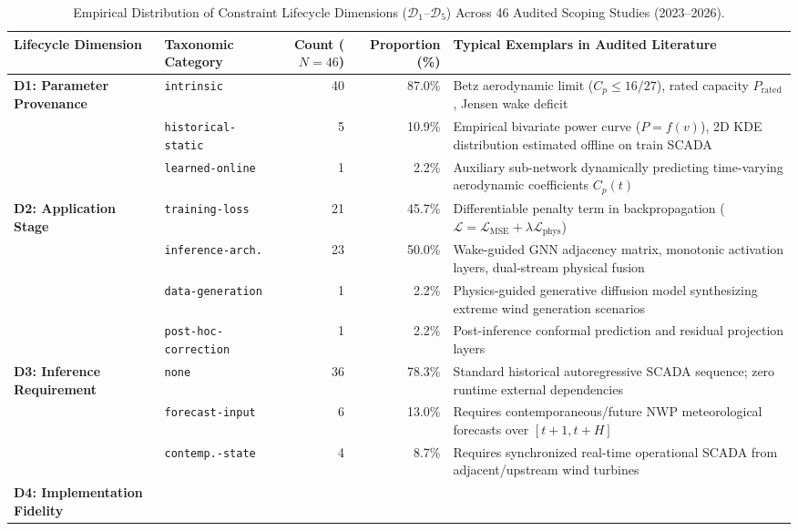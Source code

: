 \begin{table}[!t]
\centering
\footnotesize
\renewcommand{\arraystretch}{0.90}
\setlength{\tabcolsep}{2.5pt}
\caption{Empirical Distribution of Constraint Lifecycle Dimensions ($\mathcal{D}_1$--$\mathcal{D}_5$) Across 46 Audited Scoping Studies (2023--2026).}
\label{tab:lifecycle_distribution}
\noindent\begin{tabularx}{\linewidth}{p{3.2cm}p{3.1cm}rrX}
\toprule
\textbf{Lifecycle Dimension} & \textbf{Taxonomic Category} & \textbf{Count ($N=46$)} & \textbf{Proportion (\%)} & \textbf{Typical Exemplars in Audited Literature} \\
\midrule
\multirow{3}{=}{\textbf{D1: Parameter Provenance}} 
& \texttt{intrinsic} & 40 & 87.0\% & Betz aerodynamic limit ($C_p \le 16/27$), rated capacity $P_{\text{rated}}$, Jensen wake deficit \\
& \texttt{historical-static} & 5 & 10.9\% & Empirical bivariate power curve ($P=f(v)$), 2D KDE distribution estimated offline on train SCADA \\
& \texttt{learned-online} & 1 & 2.2\% & Auxiliary sub-network dynamically predicting time-varying aerodynamic coefficients $C_p(t)$ \\
\midrule
\multirow{4}{=}{\textbf{D2: Application Stage}} 
& \texttt{training-loss} & 21 & 45.7\% & Differentiable penalty term in backpropagation ($\mathcal{L} = \mathcal{L}_{\text{MSE}} + \lambda \mathcal{L}_{\text{phys}}$) \\
& \texttt{inference-arch.} & 23 & 50.0\% & Wake-guided GNN adjacency matrix, monotonic activation layers, dual-stream physical fusion \\
& \texttt{data-generation} & 1 & 2.2\% & Physics-guided generative diffusion model synthesizing extreme wind generation scenarios \\
& \texttt{post-hoc-correction} & 1 & 2.2\% & Post-inference conformal prediction and residual projection layers \\
\midrule
\multirow{3}{=}{\textbf{D3: Inference Requirement}} 
& \texttt{none} & 36 & 78.3\% & Standard historical autoregressive SCADA sequence; zero runtime external dependencies \\
& \texttt{forecast-input} & 6 & 13.0\% & Requires contemporaneous/future NWP meteorological forecasts over $[t+1, t+H]$ \\
& \texttt{contemp.-state} & 4 & 8.7\% & Requires synchronized real-time operational SCADA from adjacent/upstream wind turbines \\
\midrule
\multirow{3}{=}{\textbf{D4: Implementation Fidelity}} 

\end{tabularx}
\end{table}
